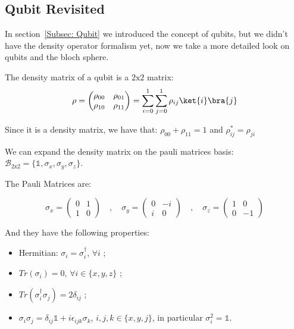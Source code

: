 \subsection{Qubit Revisited}
\label{Subsection: Qubit Revisited}

In section~\ref{Subsec: Qubit} we introduced the concept of qubits, but we didn't have the density operator formalism yet, now we take a more detailed look on qubits and the bloch sphere.

The density matrix of a qubit is a $2\mathrm{x}2$ matrix: 
\begin{equation}
    \rho = \begin{pmatrix}
    \rho_{00} & \rho_{01} \\
    \rho_{10} & \rho_{11}
    \end{pmatrix} = \sum_{i=0}^1 \sum_{j=0}^1 \rho_{ij} \ket{i} \bra{j}
\end{equation}

Since it is a density matrix, we have that: $\rho_{00} + \rho_{11} = 1$ and $\rho_{ij}^* = \rho_{ji}$

We can expand the density matrix on the pauli matrices basis: $\mathcal{B}_{2\mathrm{x}2} = \{\mathds{1}, \sigma_x, \sigma_y, \sigma_z \}$.

The Pauli Matrices are: 

\begin{equation}
    \sigma_x = \begin{pmatrix}
    0 & 1 \\
    1 & 0
    \end{pmatrix} \hspace{1em} , \hspace{1em}  \sigma_y = \begin{pmatrix}
    0 & -i \\
    i & 0
    \end{pmatrix} \hspace{1em} , \hspace{1em}  \sigma_z = \begin{pmatrix}
    1 & 0 \\
    0 & -1
    \end{pmatrix}
\end{equation}

And they have the following properties:
\begin{itemize}
    \item Hermitian: $\sigma_i = \sigma_i^{\dagger}$, $\forall i$ ;
    \item $Tr(\sigma_i) = 0$, $\forall i \in \{x,y,z \}$ ;
    \item $Tr(\sigma_i^{\dagger} \sigma_j) = 2 \delta_{ij}$ ;
    \item $\sigma_i \sigma_j = \delta_{ij} \mathds{1} + i  \epsilon_{ijk} \sigma_k$, $i,j,k \in \{x,y,j \}$, in particular $\sigma_i^2 = \mathds{1}$.
\end{itemize}

